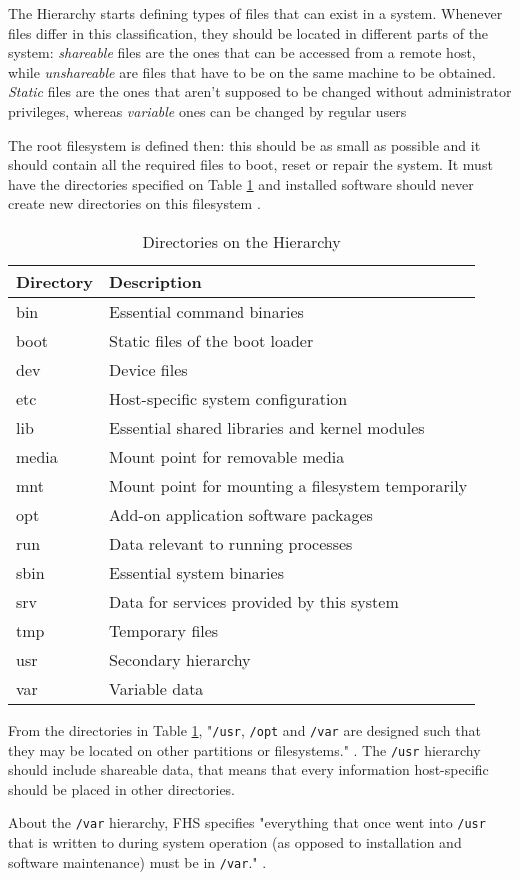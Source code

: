 The Hierarchy starts defining types of files that can exist in a system. Whenever files differ in this classification, they should be located in different parts of the system: \textit{shareable} files are the ones that can be accessed from a remote host, while \textit{unshareable} are files that have to be on the same machine to be obtained. \textit{Static} files are the ones that aren't supposed to be changed without administrator privileges, whereas \textit{variable} ones can be changed by regular users \cite{allbery2015filesystem}

The root filesystem is defined then: this should be as small as possible and it should contain all the required files to boot, reset or repair the system. It must have the directories specified on Table \ref{tab:directories} and installed software should never create new directories on this filesystem \cite{allbery2015filesystem}.


\begin{table}[h!]
\centering
\caption{Directories on the Hierarchy \cite{allbery2015filesystem}}
\label{tab:directories}
\begin{tabular}{ll}
\toprule
\textbf{Directory} & \textbf{Description} \\
\midrule
bin & Essential command binaries \\
boot & Static files of the boot loader \\
dev & Device files \\
etc & Host-specific system configuration \\
lib & Essential shared libraries and kernel modules \\
media & Mount point for removable media \\
mnt & Mount point for mounting a filesystem temporarily \\
opt & Add-on application software packages \\
run & Data relevant to running processes \\
sbin & Essential system binaries \\
srv & Data for services provided by this system \\
tmp & Temporary files \\
usr & Secondary hierarchy \\
var & Variable data \\
\bottomrule
\end{tabular}
\end{table}


From the directories in Table \ref{tab:directories}, "\texttt{/usr}, \texttt{/opt} and \texttt{/var} are designed such that they may be located on other partitions or filesystems." \cite[p. 3]{allbery2015filesystem}. The \texttt{/usr} hierarchy should include shareable data, that means that every information host-specific should be placed in other directories.

About the \texttt{/var} hierarchy, FHS specifies "everything that once went into \texttt{/usr} that is written to during system operation (as opposed to installation and software maintenance) must be in \texttt{/var}." \cite[p. 30]{allbery2015filesystem}.
